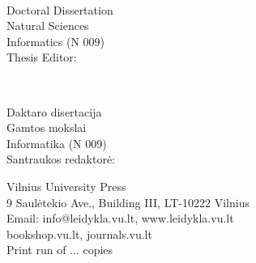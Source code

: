 \pagestyle{empty}
\cleardoublepage

\begin{flushleft}
    \thesisAuthorName \ \thesisAuthorSurname
    	
    \thesisTitleEN
    
    Doctoral Dissertation\\
    Natural Sciences\\
    Informatics (N 009)\\
    Thesis Editor: \thesisEditorEN
    
    \vspace{2cm}
    \thesisAuthorName \ \thesisAuthorSurname
    
    \thesisTitleLT
    
    Daktaro disertacija\\
    Gamtos mokslai\\
    Informatika (N 009)\\
    Santraukos redaktorė: \thesisEditorLT
\end{flushleft}

\vspace{165mm}
{
	\vspace*{\fill}
	
	\centering
    Vilnius University Press\\
    9 Saulėtekio Ave., Building III, LT-10222 Vilnius\\
    Email: info@leidykla.vu.lt, www.leidykla.vu.lt\\
    bookshop.vu.lt, journals.vu.lt \\
    Print run of ... copies\\
    
}